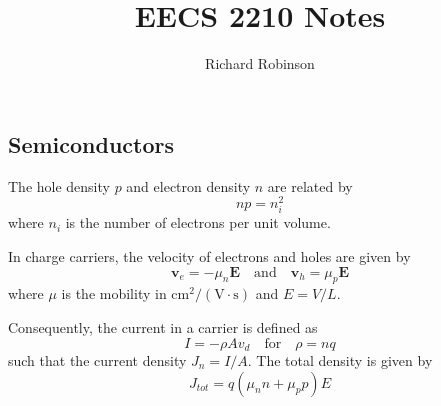 \documentclass[11pt, letterpaper]{article}
\title{\textbf{EECS 2210 Notes}}
\author{Richard Robinson}
\begin{document}
\maketitle

\begin{multicols*}{2}

\section{Semiconductors}
The hole density $p$ and electron density $n$ are related by \begin{equation}
    np = n_i^2
\end{equation}
where $n_i$ is the number of electrons per unit volume.

\bigskip
In charge carriers, the velocity of electrons and holes are given by \begin{equation}
    \mathbf v_e = - \mu_n \mathbf E \quad\text{and}\quad \mathbf v_h = \mu_p \mathbf E
\end{equation}
where $\mu$ is the mobility in $\text{cm}^2/(\text{V}\cdot\text{s})$ and $E = V/L$.

\bigskip
Consequently, the current in a carrier is defined as \begin{equation}
    I = -\rho A v_d \quad\text{for}\quad \rho = nq
\end{equation}
such that the current density $J_n = I/A$. The total density is given by \begin{equation}
    J_{tot} = q(\mu_n n + \mu_p p)E
\end{equation}

\end{multicols*}
\end{document}
